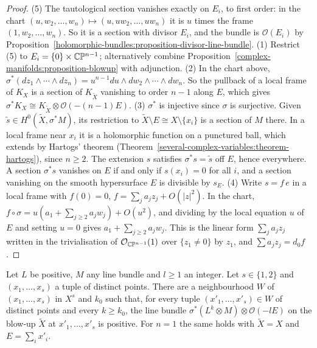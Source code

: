 \begin{proof}
(5) The tautological section vanishes exactly on $E_i$, to first order: in the chart $(u, w_2, \ldots, w_n) \mapsto (u, uw_2, \ldots, uw_n)$ it is $u$
times the frame $(1, w_2, \ldots, w_n)$. So it is a section with divisor $E_i$, and the bundle is $\mathcal{O}(E_i)$ by
Proposition~\ref{holomorphic-bundles:proposition-divisor-line-bundle}. (1) Restrict (5) to $E_i = \{0\} \times \mathbb{C}\mathbb{P}^{n-1}$; alternatively
combine Proposition~\ref{complex-manifolds:proposition-blowup} with adjunction. (2) In the chart above,
$\sigma^*(dz_1 \wedge \cdots \wedge dz_n) = u^{n-1}du \wedge dw_2 \wedge \cdots \wedge dw_n$. So the pullback of a local frame of $K_X$ is a section of
$K_{\tilde X}$ vanishing to order $n - 1$ along $E$, which gives $\sigma^*K_X \cong K_{\tilde X} \otimes \mathcal{O}(-(n-1)E)$. (3) $\sigma^*$ is
injective since $\sigma$ is surjective. Given $\tilde s \in H^0(\tilde X, \sigma^*M)$, its restriction to $\tilde X \setminus E \cong X \setminus \{x_i\}$ is
a section of $M$ there. In a local frame near $x_i$ it is a holomorphic function on a punctured ball, which extends by Hartogs' theorem
(Theorem~\ref{several-complex-variables:theorem-hartogs}), since $n \geq 2$. The extension $s$ satisfies $\sigma^*s = \tilde s$ off $E$, hence
everywhere. A section $\sigma^*s$ vanishes on $E$ if and only if $s(x_i) = 0$ for all $i$, and a section vanishing on the smooth hypersurface $E$ is
divisible by $s_E$. (4) Write $s = f\,e$ in a local frame with $f(0) = 0$, $f = \sum_ja_jz_j + O(|z|^2)$. In the chart,
$f \circ \sigma = u(a_1 + \sum_{j \geq 2}a_jw_j) + O(u^2)$, and dividing by the local equation $u$ of $E$ and setting $u = 0$ gives
$a_1 + \sum_{j \geq 2}a_jw_j$. This is the linear form $\sum_ja_jz_j$ written in the trivialisation of $\mathcal{O}_{\mathbb{C}\mathbb{P}^{n-1}}(1)$ over
$\{z_1 \neq 0\}$ by $z_1$, and $\sum a_jz_j = d_0f$.
\end{proof}

\begin{lemma}\label{kodaira:lemma-positivity-blowup}
Let $L$ be positive, $M$ any line bundle and $l \geq 1$ an integer. Let $s \in \{1, 2\}$ and $(x_1, \ldots, x_s)$ a tuple of distinct points. There
are a neighbourhood $W$ of $(x_1, \ldots, x_s)$ in $X^s$ and $k_0$ such that, for every tuple $(x'_1, \ldots, x'_s) \in W$ of distinct points and
every $k \geq k_0$, the line bundle $\sigma^*(L^k \otimes M) \otimes \mathcal{O}(-lE)$ on the blow-up $\tilde X$ at $x'_1, \ldots, x'_s$ is positive.
For $n = 1$ the same holds with $\tilde X = X$ and $E = \sum_ix'_i$.
\end{lemma}

